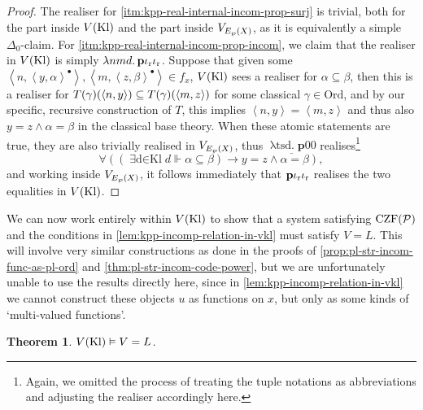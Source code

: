 \documentclass[12pt,openany]{book}
\theoremstyle{plain}
\newtheorem{theorem}{Theorem}[section]
\theoremstyle{definition}
\newcommand\tuple[1]{\left\langle #1 \right\rangle}
\newcommand\opA[1]{\mathop{\forall #1}}
\newcommand\opE[1]{\mathop{\exists #1}}
\newcommand\oplam[1]{\mathop{\lambda #1.}}
\newcommand\Pow{\mathcal{P}}
\newcommand\CZFP{\mathrm{CZF}\mleft(\Pow\mright)}
\newcommand\Ord{\mathrm{Ord}}
\newcommand\Kl{\mathrm{Kl}}
\newcommand\bp{\mathbf{p}}
\newcommand\ior{\iota_\textup{r}}
\begin{document}
\begin{proof}
  The realiser for \ref{itm:kpp-real-internal-incom-prop-surj} is trivial, both for the part inside $V\mleft(\Kl\mright)$ and the part inside $V_{E_\wp\mleft(X\mright)}$, as it is equivalently a simple $\Delta_0$-claim. For \ref{itm:kpp-real-internal-incom-prop-incom}, we claim that the realiser in $V\mleft(\Kl\mright)$ is simply $\oplam{nmd} \bp \ior \ior$. Suppose that given some $\tuple{n, \tuple{y, \alpha}^\bullet}, \tuple{m, \tuple{z, \beta}^\bullet} \in f_x$, $V\mleft(\Kl\mright)$ sees a realiser for $\alpha \subseteq \beta$, then this is a realiser for $T\mleft(\gamma\mright)\mleft(\tuple{n, y}\mright) \subseteq T\mleft(\gamma\mright)\mleft(\tuple{m, z}\mright)$ for some classical $\gamma \in \Ord$, and by our specific, recursive construction of $T$, this implies $\tuple{n, y} = \tuple{m, z}$ and thus also $y = z \land \alpha = \beta$ in the classical base theory. When these atomic statements are true, they are also trivially realised in $V_{E_\wp\mleft(X\mright)}$, thus $\underline{\oplam{tsd} \bp 00}$ realises\footnote{Again, we omitted the process of treating the tuple notations as abbreviations and adjusting the realiser accordingly here.}
  \[\opA{{\tuple{n, \tuple{y, \alpha}^\bullet}, \tuple{m, \tuple{z, \beta}^\bullet} \in f_x}} \left(\left(\opE{d \in \Kl} d \Vdash \alpha \subseteq \beta\right) \rightarrow y = z \land \alpha = \beta\right),\]
  and working inside $V_{E_\wp\mleft(X\mright)}$, it follows immediately that $\bp \ior \ior$ realises the two equalities in $V\mleft(\Kl\mright)$.
\end{proof}

We can now work entirely within $V\mleft(\Kl\mright)$ to show that a system satisfying $\CZFP$ and the conditions in \autoref{lem:kpp-incomp-relation-in-vkl} must satisfy $V = L$. This will involve very similar constructions as done in the proofs of \autoref{prop:pl-str-incom-func-as-pl-ord} and \autoref{thm:pl-str-incom-code-power}, but we are unfortunately unable to use the results directly here, since in \autoref{lem:kpp-incomp-relation-in-vkl} we cannot construct these objects $u$ as functions on $x$, but only as some kinds of `multi-valued functions'.

\begin{theorem}
  \label{thm:kpp-real-v-l}
  $V\mleft(\Kl\mright) \vDash V = L$.
\end{theorem}
\end{document}
